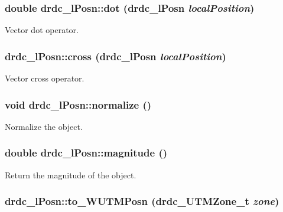 \hypertarget{classdrdc__lPosn_97a8281cc5a20e38b0ca91226e80595f}{
\subsubsection[dot]{\setlength{\rightskip}{0pt plus 5cm}double drdc\_\-lPosn::dot ({\bf drdc\_\-lPosn} {\em localPosition})}}
\label{classdrdc__lPosn_97a8281cc5a20e38b0ca91226e80595f}


Vector dot operator. 

\hypertarget{classdrdc__lPosn_1fb0e2e37ecb3e79b416ce5a83a54ebb}{
\subsubsection[cross]{ drdc\_\-lPosn::cross ({\bf drdc\_\-lPosn} {\em localPosition})}}
\label{classdrdc__lPosn_1fb0e2e37ecb3e79b416ce5a83a54ebb}


Vector cross operator. 

\hypertarget{classdrdc__lPosn_2d0627c5961baeab891d62cb8a836d85}{
\subsubsection[normalize]{\setlength{\rightskip}{0pt plus 5cm}void drdc\_\-lPosn::normalize ()}}
\label{classdrdc__lPosn_2d0627c5961baeab891d62cb8a836d85}


Normalize the object. 

\hypertarget{classdrdc__lPosn_a333c2527fc3ec4398ea0940bfc1c5fc}{
\subsubsection[magnitude]{\setlength{\rightskip}{0pt plus 5cm}double drdc\_\-lPosn::magnitude ()}}
\label{classdrdc__lPosn_a333c2527fc3ec4398ea0940bfc1c5fc}


Return the magnitude of the object. 

\hypertarget{classdrdc__lPosn_243a0513a9126c8e171953e663bdb213}{
\subsubsection[to\_\-WUTMPosn]{ drdc\_\-lPosn::to\_\-WUTMPosn ({\bf drdc\_\-UTMZone\_\-t} {\em zone})}}
\label{classdrdc__lPosn_243a0513a9126c8e171953e663bdb213}


